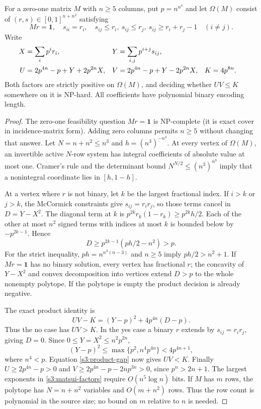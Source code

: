 \begin{lemma}\label{s3:matsui}
For a zero-one matrix $M$ with $n\ge5$ columns, put $p=n^{n^4}$ and let
$\Omega(M)$ consist of $(r,s)\in[0,1]^{n+n^2}$ satisfying
\[
 Mr=\mathbf1,\quad s_{ii}=r_i,\quad
 s_{ij}\le r_i,\ s_{ij}\le r_j,\ s_{ij}\ge r_i+r_j-1\quad(i\ne j).
\]
Write
\begin{align}
 X&=\sum_i p^i r_i,&Y&=\sum_{i,j}p^{i+j}s_{ij},\notag\\
 U&=2p^{4n}-p+Y+2p^{2n}X,&
 V&=2p^{4n}-p+Y-2p^{2n}X,&K&=4p^{8n}.
 \label{s3:matsui-factors}
\end{align}
Both factors are strictly positive on $\Omega(M)$, and deciding whether
$UV\le K$ somewhere on it is NP-hard. All coefficients have polynomial
binary encoding length.
\end{lemma}
\begin{proof}
The zero-one feasibility question $Mr=\mathbf1$ is NP-complete (it is
exact cover in incidence-matrix form). Adding zero columns permits
$n\ge5$ without changing that answer. Let $N=n+n^2\le n^3$ and
$h=(n^3)^{-n^3}$. At every vertex of $\Omega(M)$, an invertible active
$N$-row system has integral coefficients of absolute value at most one.
Cramer's rule and the determinant bound $N^{N/2}\le(n^3)^{n^3}$ imply
that a nonintegral coordinate lies in $[h,1-h]$.

At a vertex where $r$ is not binary, let $k$ be the largest fractional
index. If $i>k$ or $j>k$, the McCormick constraints give
$s_{ij}=r_ir_j$, so those terms cancel in $D=Y-X^2$. The diagonal
term at $k$ is $p^{2k}r_k(1-r_k)\ge p^{2k}h/2$. Each of the other
at most $n^2$ signed terms with indices at most $k$ is bounded below
by $-p^{2k-1}$. Hence
\begin{equation}
 D\ge p^{2k-1}(ph/2-n^2)>p.\label{s3:corrected-matsui-gap}
\end{equation}
For the strict inequality, $ph=n^{n^3(n-3)}$ and $n\ge5$ imply
$ph/2>n^2+1$. If $Mr=\mathbf1$ has no binary solution, every vertex
has fractional $r$; the concavity of $Y-X^2$ and convex decomposition
into vertices extend $D>p$ to the whole nonempty polytope. If the
polytope is empty the product decision is already negative.

The exact product identity is
\begin{equation}
 UV-K=(Y-p)^2+4p^{4n}(D-p).\label{s3:product-gap}
\end{equation}
Thus the no case has $UV>K$. In the yes case a binary $r$ extends by
$s_{ij}=r_ir_j$, giving $D=0$. Since $0\le Y=X^2\le n^2p^{2n}$,
\[
 (Y-p)^2\le\max\{p^2,n^4p^{4n}\}<4p^{4n+1},
\]
where $n^4<p$. Equation \eqref{s3:product-gap} now gives $UV<K$.
Finally $U\ge2p^{4n}-p>0$ and
$V\ge2p^{4n}-p-2np^{3n}>0$, since $p^n>2n+1$.
The largest exponents in \eqref{s3:matsui-factors} require
$O(n^5\log n)$ bits. If $M$ has $m$ rows, the polytope has $N=n+n^2$ variables and
$O(m+n^2)$ rows. Thus the row count is polynomial in the source size;
no bound on $m$ relative to $n$ is needed.
\end{proof}

